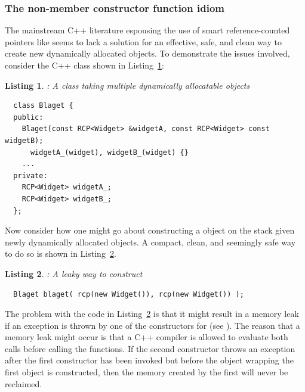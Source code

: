 \documentclass[pdf,ps2pdf,11pt]{SANDreport}
\newtheorem{listing}{Listing}
\begin{document}
%
{}\subsubsection{The non-member constructor function idiom}
\label{sec:nonmember-constructor-idiom}
%

The mainstream C++ literature espousing the use of smart
reference-counted pointers like {} seems to
lack a solution for an effective, safe, and clean way to create new
dynamically allocated objects.  To demonstrate the issues involved,
consider the C++ class {} shown in
Listing~\ref{listing:BlagetClass}:

\begin{listing}: A class taking multiple dynamically allocatable objects \\
\label{listing:BlagetClass}
{\small\begin{verbatim}
  class Blaget {
  public:
    Blaget(const RCP<Widget> &widgetA, const RCP<Widget> const widgetB);
      widgetA_(widget), widgetB_(widget) {}
    ...
  private:
    RCP<Widget> widgetA_;
    RCP<Widget> widgetB_;
  };
\end{verbatim}}
\end{listing}

Now consider how one might go about constructing a {}
object on the stack given newly dynamically allocated {}
objects.  A compact, clean, and seemingly safe way to do so is shown
in Listing~\ref{listing:BlagetConstruct1}.

\begin{listing}: A leaky way to construct \\
\label{listing:BlagetConstruct1}
{\small\begin{verbatim}
  Blaget blaget( rcp(new Widget()), rcp(new Widget()) );
\end{verbatim}}
\end{listing}

The problem with the code in Listing~\ref{listing:BlagetConstruct1}
is that it might result in a memory leak if an exception is thrown by
one of the constructors for {} (see {}\cite[Item
13]{C++CodingStandards05}).  The reason that a memory leak might occur
is that a C++ compiler is allowed to evaluate both {} calls before calling the {} functions.
If the second constructor {} throws an exception
after the first {} constructor has been invoked
but before the {} object wrapping the first
{} object is constructed, then the memory created by
the first {} will never be reclaimed.
\end{document}
